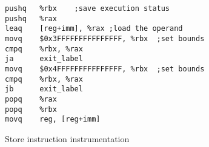 \begin{figure}
\begin{center}
\begin{minipage}{0.4\textwidth}
\begin{lstlisting}[basicstyle=\scriptsize]
pushq   %rbx    ;save execution status
pushq   %rax
leaq    [reg+imm], %rax ;load the operand
movq    $0x3FFFFFFFFFFFFFFF, %rbx  ;set bounds
cmpq    %rbx, %rax
ja      exit_label
movq    $0x4FFFFFFFFFFFFFFF, %rbx  ;set bounds
cmpq    %rbx, %rax              
jb      exit_label
popq    %rax
popq    %rbx
movq    reg, [reg+imm]
\end{lstlisting}
\end{minipage}
\end{center}
\vspace{-8pt}
\caption{Store instruction instrumentation}\label{fg-mov}
\vspace{-15pt}
\end{figure}